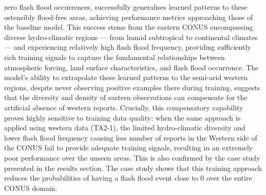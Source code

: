 zero flash flood occurrences, successfully generalises learned patterns to these ostensibly flood-free areas, achieving performance metrics approaching those of the baseline model. This success stems from the eastern CONUS encompassing diverse hydro-climatic regions — from humid subtropical to continental climates — and experiencing relatively high flash flood frequency, providing sufficiently rich training signals to capture the fundamental relationships between atmospheric forcing, land surface characteristics, and flash flood occurrence. The model's ability to extrapolate these learned patterns to the semi-arid western regions, despite never observing positive examples there during training, suggests that the diversity and density of eastern observations can compensate for the artificial absence of western reports. Crucially, this compensatory capability proves highly sensitive to training data quality: when the same approach is applied using western data (TA2-1), the limited hydro-climatic diversity and lower flash flood frequency causing less number of reports in the Western side of the CONUS fail to provide adequate training signals, resulting in an extremely poor performance over the unseen areas. This is also confirmed by the case study presented in the results section. The case study shows that this training approach reduces the probabilities of having a flash flood event close to 0 over the entire CONUS domain.

